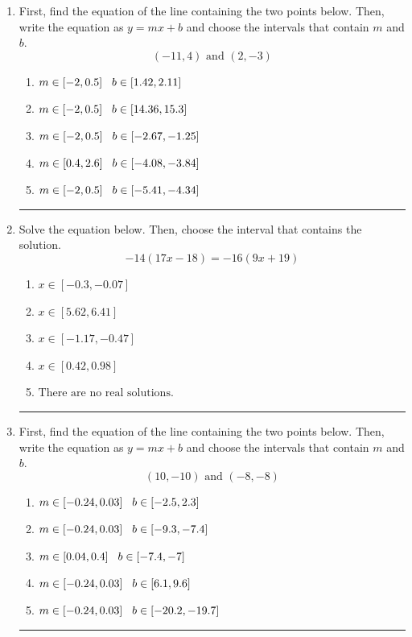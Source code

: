 \documentclass[14pt]{extbook}
\newcommand{\litem}[1]{\item#1\hspace*{-1cm}\rule{\textwidth}{0.4pt}}
\begin{document}
\begin{enumerate}
{\begin{enumerate}[label=\Alph*.]
\end{enumerate} }
\litem{
First, find the equation of the line containing the two points below. Then, write the equation as $ y=mx+b $ and choose the intervals that contain $m$ and $b$.\[ (-11, 4) \text{ and } (2, -3) \]\begin{enumerate}[label=\Alph*.]
\item \( m \in [-2, 0.5] \hspace*{3mm} b \in [1.42, 2.11] \)
\item \( m \in [-2, 0.5] \hspace*{3mm} b \in [14.36, 15.3] \)
\item \( m \in [-2, 0.5] \hspace*{3mm} b \in [-2.67, -1.25] \)
\item \( m \in [0.4, 2.6] \hspace*{3mm} b \in [-4.08, -3.84] \)
\item \( m \in [-2, 0.5] \hspace*{3mm} b \in [-5.41, -4.34] \)

\end{enumerate} }
\litem{
Solve the equation below. Then, choose the interval that contains the solution.\[ -14(17x -18) = -16(9x + 19) \]\begin{enumerate}[label=\Alph*.]
\item \( x \in [-0.3, -0.07] \)
\item \( x \in [5.62, 6.41] \)
\item \( x \in [-1.17, -0.47] \)
\item \( x \in [0.42, 0.98] \)
\item \( \text{There are no real solutions.} \)

\end{enumerate} }
\litem{
First, find the equation of the line containing the two points below. Then, write the equation as $ y=mx+b $ and choose the intervals that contain $m$ and $b$.\[ (10, -10) \text{ and } (-8, -8) \]\begin{enumerate}[label=\Alph*.]
\item \( m \in [-0.24, 0.03] \hspace*{3mm} b \in [-2.5, 2.3] \)
\item \( m \in [-0.24, 0.03] \hspace*{3mm} b \in [-9.3, -7.4] \)
\item \( m \in [0.04, 0.4] \hspace*{3mm} b \in [-7.4, -7] \)
\item \( m \in [-0.24, 0.03] \hspace*{3mm} b \in [6.1, 9.6] \)
\item \( m \in [-0.24, 0.03] \hspace*{3mm} b \in [-20.2, -19.7] \)


\end{enumerate}}
\end{enumerate}
\end{document}
